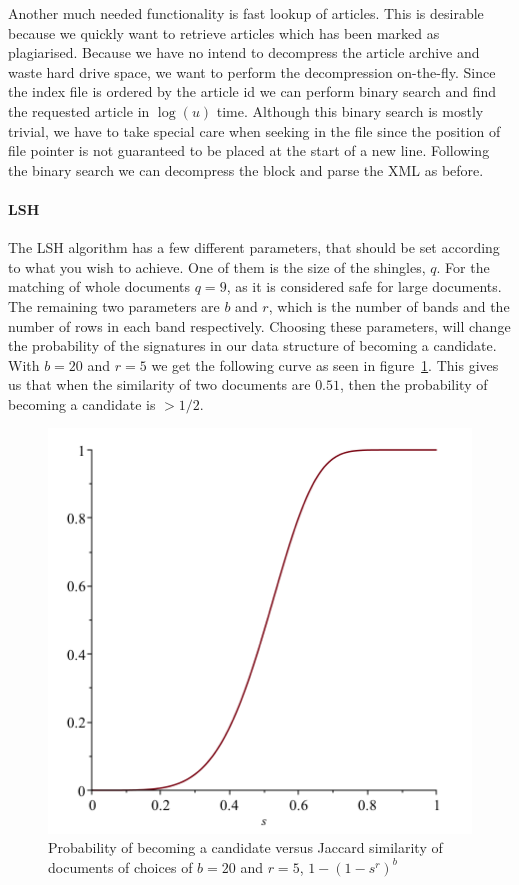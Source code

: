 Another much needed functionality is fast lookup of articles. This is desirable because we quickly want to retrieve articles which has been marked as plagiarised. Because we have no intend to decompress the article archive and waste hard drive space, we want to perform the decompression on-the-fly. Since the index file is ordered by the article id we can perform binary search and find the requested article in $\log(u)$ time. Although this binary search is mostly trivial, we have to take special care when seeking in the file since the position of file pointer is not guaranteed to be placed at the start of a new line. Following the binary search we can decompress the block and parse the XML as before.

\paragraph{LSH}

The LSH algorithm has a few different parameters, that should be set according to what you wish to achieve. One of them is the size of the shingles, $q$. For the matching of whole documents $q = 9$, as it is considered safe for large documents.\cite{leskovec2014mining} %
The remaining two parameters are $b$ and $r$, which is the number of bands and the number of rows in each band respectively. Choosing these parameters, will change the probability of the signatures in our data structure of becoming a candidate. With $b=20$ and $r=5$ we get the following curve as seen in figure~\ref{fig:lsh}. This gives us that when the similarity of two documents are $0.51$, then the probability of becoming a candidate is $>1/2$.

\begin{figure}[h]
	\centering
    \includegraphics[width = 0.4\linewidth]{docs/report/input/lsh.png}
    \captionsetup{width = \linewidth}
    \caption{Probability of becoming a candidate versus Jaccard similarity of documents of choices of $b=20$ and $r=5$, $1-(1-s^r)^b$}
    \label{fig:lsh}
\end{figure}

